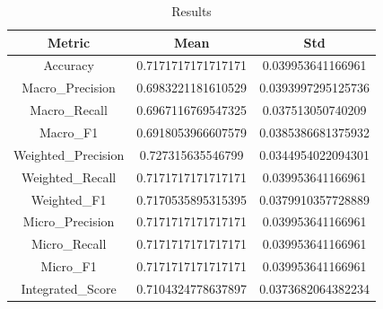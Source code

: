\begin{table}[htbp]
\centering
\caption{Results}
\label{tab:csv}
\small
\setlength{\tabcolsep}{4pt}
\begin{tabular}{|c|c|c|}
\hline
Metric & Mean & Std \\
\hline
Accuracy & 0.7171717171717171 & 0.039953641166961 \\
Macro_Precision & 0.6983221181610529 & 0.0393997295125736 \\
Macro_Recall & 0.6967116769547325 & 0.037513050740209 \\
Macro_F1 & 0.6918053966607579 & 0.0385386681375932 \\
Weighted_Precision & 0.727315635546799 & 0.0344954022094301 \\
Weighted_Recall & 0.7171717171717171 & 0.039953641166961 \\
Weighted_F1 & 0.7170535895315395 & 0.0379910357728889 \\
Micro_Precision & 0.7171717171717171 & 0.039953641166961 \\
Micro_Recall & 0.7171717171717171 & 0.039953641166961 \\
Micro_F1 & 0.7171717171717171 & 0.039953641166961 \\
Integrated_Score & 0.7104324778637897 & 0.0373682064382234 \\
\hline
\end{tabular}
\end{table}